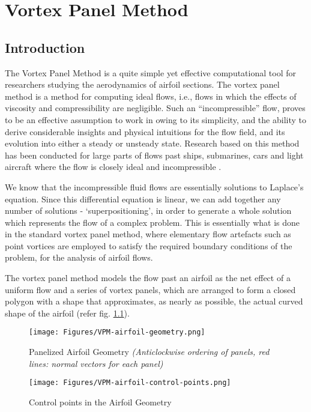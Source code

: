 \chapter{Vortex Panel Method} %
\label{Chapter4}

\section{Introduction}
The Vortex Panel Method is a quite simple yet effective computational tool for researchers studying the aerodynamics of airfoil sections. The vortex panel method is a method for computing ideal flows, i.e., flows in which the effects of viscosity and compressibility are negligible. Such an ``incompressible'' flow, proves to be an effective assumption to work in owing to its simplicity, and the ability to derive considerable insights and physical intuitions for the flow field, and its evolution into either a steady or unsteady state.
Research based on this method has been conducted for large parts of flows past ships, submarines, cars and light aircraft where the flow is closely ideal and incompressible \parencite{Bertin1998-wg}.

We know that the incompressible fluid flows are essentially solutions to Laplace’s equation. Since this differential equation is linear, we can add together any number of solutions - `superpositioning', in order to generate a whole solution which represents the flow of a complex problem. This is essentially what is done in the standard vortex panel method, where elementary flow artefacts such as point vortices are employed to satisfy the required boundary conditions of the problem, for the analysis of airfoil flows.

The vortex panel method \parencite{Kuethe1987-qq} models the flow past an airfoil as the net effect of a uniform flow and a series of vortex panels, which are arranged to form a closed polygon with a shape that approximates, as nearly as possible, the actual curved shape of the airfoil (refer fig. \ref{fig:VPM-airfoil-geometry}). 

\begin{figure}[H]
	\centering
	\texttt{[image: Figures/VPM-airfoil-geometry.png]}
	\caption{Panelized Airfoil Geometry \textit{(Anticlockwise ordering of panels, red lines: normal vectors for each panel)}}
	\label{fig:VPM-airfoil-geometry}
\end{figure}
\begin{figure}[H]
	\centering
	\texttt{[image: Figures/VPM-airfoil-control-points.png]}
	\caption{Control points in the Airfoil Geometry}
	\label{fig:VPM-airfoil-control-point}
\end{figure}

